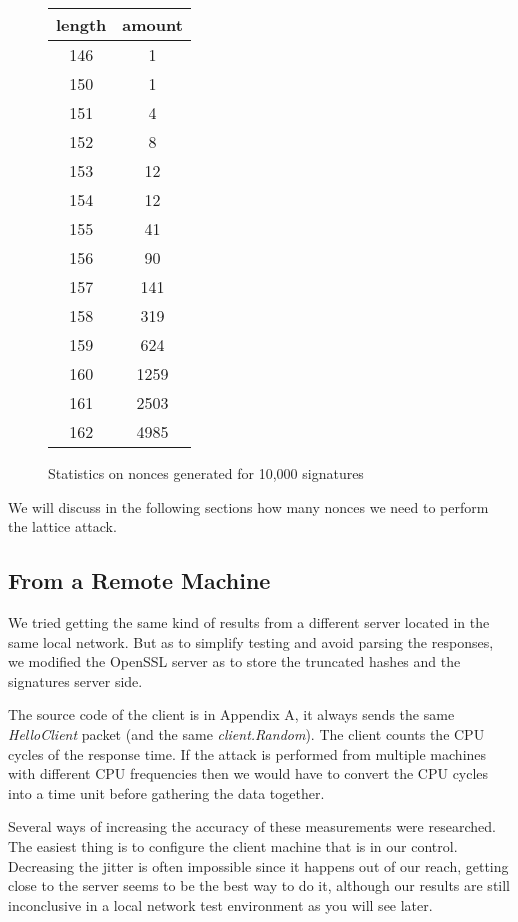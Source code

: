 \documentclass[a4paper,11pt]{article}
\begin{document}
\begin{figure}[H]
\begin{center} 
\begin{tabular}{@{} *2c @{}}
\toprule
length & amount \\ 
\midrule
146 &    1      \\
150&     1       \\
151 &    4       \\
152  &   8       \\
153   &  12      \\
154  &   12      \\
155 &    41      \\
156&     90      \\
157 &    141     \\
158 &    319     \\
159  &   624     \\
160   &  1259    \\
161    & 2503   \\ 
162     &4985    
\bottomrule
\end{tabular}
\end{center} 
\caption{Statistics on nonces generated for 10,000 signatures}
\end{figure}

We will discuss in the following sections how many nonces we need to perform the lattice attack.


\subsection{From a Remote Machine}

We tried getting the same kind of results from a different server located in the same local network. But as to simplify testing and avoid parsing the responses, we modified the OpenSSL server as to store the truncated hashes and the signatures server side.

The source code of the client is in Appendix A, it always sends the same \textit{HelloClient} packet (and the same \textit{client.Random}). The client counts the CPU cycles of the response time. If the attack is performed from multiple machines with different CPU frequencies then we would have to convert the CPU cycles into a time unit before gathering the data together.

Several ways of increasing the accuracy of these measurements were researched. The easiest thing is to configure the client machine that is in our control. Decreasing the jitter is often impossible since it happens out of our reach, getting close to the server seems to be the best way to do it, although our results are still inconclusive in a local network test environment as you will see later.
\end{document}
